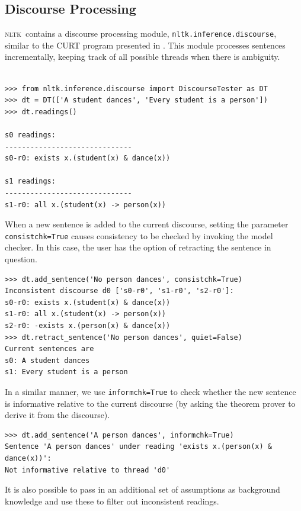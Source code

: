 \documentclass[11pt, a4paper]{article}
\newcommand{\NLTK}{\textsc{nltk}}
\begin{document}
\subsection{Discourse Processing}
\NLTK\ contains a discourse processing module,
\texttt{nltk.inference.discourse}, similar to the CURT program
presented in \cite{BB}.  This module processes sentences incrementally,
keeping track of all possible threads when there is ambiguity.
\begin{Verbatim}[baselinestretch=.5]

>>> from nltk.inference.discourse import DiscourseTester as DT
>>> dt = DT(['A student dances', 'Every student is a person'])
>>> dt.readings()

s0 readings:
------------------------------
s0-r0: exists x.(student(x) & dance(x))

s1 readings:
------------------------------
s1-r0: all x.(student(x) -> person(x))
\end{Verbatim}
When a new sentence is added to the current discourse, setting the
parameter \texttt{consistchk=True} causes consistency to be checked
by invoking the model checker. In this case, the user has the option
of retracting the sentence in question.
\begin{Verbatim}
>>> dt.add_sentence('No person dances', consistchk=True)
Inconsistent discourse d0 ['s0-r0', 's1-r0', 's2-r0']:
s0-r0: exists x.(student(x) & dance(x))
s1-r0: all x.(student(x) -> person(x))
s2-r0: -exists x.(person(x) & dance(x))
>>> dt.retract_sentence('No person dances', quiet=False)
Current sentences are 
s0: A student dances
s1: Every student is a person
\end{Verbatim}
In a similar manner, we use \texttt{informchk=True} to check whether
the new sentence is informative relative to the current discourse (by
asking the theorem prover to derive it from the discourse).
\begin{Verbatim}
>>> dt.add_sentence('A person dances', informchk=True)
Sentence 'A person dances' under reading 'exists x.(person(x) & dance(x))':
Not informative relative to thread 'd0'
\end{Verbatim}
It is also possible to pass in an additional set of assumptions as
background knowledge and use these to filter out inconsistent readings.



\end{document}
